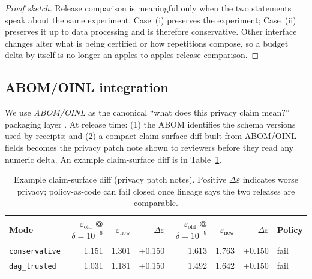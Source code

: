 \documentclass[11pt]{article}
\newcommand{\eps}{\varepsilon}
\begin{document}
\begin{proof}[Proof sketch]
Release comparison is meaningful only when the two statements speak about the same experiment.
Case~(i) preserves the experiment; Case~(ii) preserves it up to data processing and is therefore conservative.
Other interface changes alter what is being certified or how repetitions compose, so a budget delta by itself is no longer an apples-to-apples release comparison.
\end{proof}

\subsection{ABOM/OINL integration}
We use \emph{ABOM/OINL} as the canonical ``what does this privacy claim mean?'' packaging layer \cite{series:abom}.
At release time:
(1) the ABOM identifies the schema versions used by receipts; and
(2) a compact claim-surface diff built from ABOM/OINL fields becomes the privacy patch note shown to reviewers before they read any numeric delta.
An example claim-surface diff is in Table~\ref{tab:pbom-diff}.

\begin{table}[t]
\centering
\small
\begin{tabular}{@{}lrrrrrrl@{}}
\toprule
Mode & $\eps_\text{old}$ @ $\delta=10^{-6}$ & $\eps_\text{new}$ & $\Delta\eps$ & $\eps_\text{old}$ @ $\delta=10^{-9}$ & $\eps_\text{new}$ & $\Delta\eps$ & Policy \\
\midrule
\texttt{conservative} & 1.151 & 1.301 & +0.150 & 1.613 & 1.763 & +0.150 & fail \\
\texttt{dag\_trusted} & 1.031 & 1.181 & +0.150 & 1.492 & 1.642 & +0.150 & fail \\
\bottomrule
\end{tabular}
\caption{Example claim-surface diff (privacy patch notes). Positive $\Delta\eps$ indicates worse privacy; policy-as-code can fail closed once lineage says the two releases are comparable.}
\label{tab:pbom-diff}
\end{table}
\end{document}
